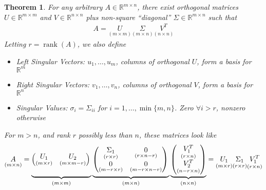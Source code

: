 \documentclass[12pt]{article}
\numberwithin{equation}{section} %
\theoremstyle{plain}
\newtheorem{thm}{Theorem}[section]
\theoremstyle{definition}
\theoremstyle{remark}
\newcommand{\Rn}{\mathbb{R}^n}
\newcommand{\Rm}{\mathbb{R}^m}
\newcommand{\Rmn}{\mathbb{R}^{m\times n}}
\newcommand{\Rmm}{\mathbb{R}^{m\times m}}
\newcommand{\Rnn}{\mathbb{R}^{n\times n}}
\newcommand{\rank}{\operatorname{rank}}
\begin{document}
\begin{thm}
For any arbitrary $A\in\Rmn$, there exist orthogonal matrices $U\in\Rmm$
and $V\in\Rnn$ plus non-square ``diagonal'' $\Sigma\in\Rmn$ such that
\begin{align*}
  A
 =
  \underset{(m\times m)}{U}
  \underset{(m\times n)}{\Sigma}
  \underset{(n\times n)}{V^T}
\end{align*}
Letting $r=\rank(A)$, we also define
\begin{itemize}
  \item \emph{Left Singular Vectors}: $u_1,\ldots,u_m$, columns of
    orthogonal $U$, form a basis for $\Rm$
  \item \emph{Right Singular Vectors}: $v_1,\ldots,v_n$, columns of
    orthogonal $V$, form a basis for $\Rn$
  \item \emph{Singular Values}: $\sigma_i=\Sigma_{ii}$ for
    $i=1,\ldots,\min\{m,n\}$. Zero $\forall i> r$, nonzero
    otherwise
\end{itemize}
For $m>n$, and rank $r$ possibly less than $n$, these matrices look like
\begin{align}
  \underset{(m\times n)}{A}
  =
  \underbrace{%
    \begin{pmatrix}
      \underset{(m\times r)}{U_1}
      &
      \underset{(m\times m-r)}{U_2}
    \end{pmatrix}
    \vphantom{%
    \begin{pmatrix}
      \underset{(r\times n)}{V_1^T}
      \\
      \underset{(n-r\times n)}{V^T_2}
    \end{pmatrix}
    }
  }_{(m\times m)}
  \underbrace{%
    \begin{pmatrix}
      \underset{(r\times r)}{\Sigma_1}
      &
      \underset{(r\times n-r)}{0}
      \\
      \underset{(m-r\times r)}{0}
      &
      \underset{(m-r\times n-r)}{0}
    \end{pmatrix}
    \vphantom{%
    \begin{pmatrix}
      \underset{(r\times n)}{V_1^T}
      \\
      \underset{(n-r\times n)}{V^T_2}
    \end{pmatrix}
    }
  }_{(m\times n)}
  \underbrace{%
    \begin{pmatrix}
      \underset{(r\times n)}{V_1^T}
      \\
      \underset{(n-r\times n)}{V^T_2}
    \end{pmatrix}
  }_{(n\times n)}
  =
  \underset{(m\times r)}{U_1}
  \underset{(r\times r)}{\Sigma_1}
  \underset{(r\times n)}{V_1^T}
  \label{svd}
\end{align}
\end{thm}
\end{document}

